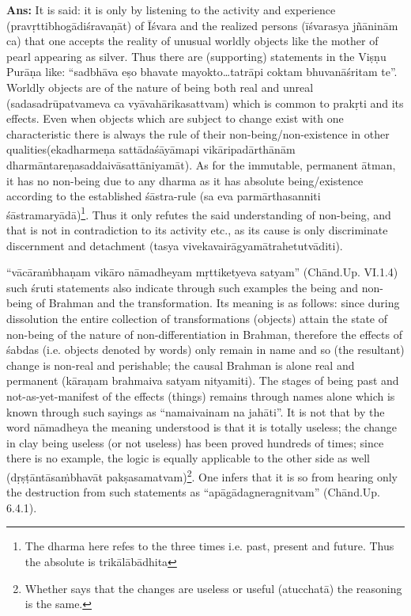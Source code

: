 \textbf{Ans:} It is said: it is only by listening to the activity and experience (pravṛttibhogādiśravaṇāt) of Īśvara and the realized persons (īśvarasya jñāninām ca) that one accepts the reality of unusual worldly objects like the mother of pearl appearing as silver. Thus there are (supporting) statements in the Viṣṇu Purāṇa like: “sadbhāva eṣo bhavate mayo\-kto…tatrāpi coktam bhuvanāśritam te”. Worldly objects are of the nature of being both real and unreal (sadasadrūpatvameva ca vyāvahāri\-kasattvam) which is common to prakṛti and its effects. Even when objects which are subject to change exist with one characteristic there is always the rule of their non-being/non-existence in other qualities\break (ekadharmeṇa sattādaśāyāmapi vikāripadārthānām dharmāntareṇa\break saddaivāsattāniyamāt). As for the immutable, permanent ātman, it has no non-being due to any dharma as it has absolute being/existence according to the established śāstra-rule (sa eva parmārthasanniti śāstramaryādā)\footnote{The dharma here refes to the three times i.e. past, present and future. Thus the absolute is trikālābādhita}. Thus it only refutes the said understanding of non-being, and that is not in contradiction to its activity etc., as its cause is only discriminate discernment and detachment (tasya vivekavairāgyamātrahetutvāditi).

“vācāraṁbhaṇam vikāro nāmadheyam mṛttiketyeva satyam” (Chānd.\break Up. VI.1.4) such śruti statements also indicate through such examples the being and non-being of Brahman and the transformation. Its meaning is as follows: since during dissolution the entire collection of transformations (objects) attain the state of non-being of the nature of non-differentiation in Brahman, therefore the effects of śabdas (i.e. objects denoted by words) only remain in name and so (the resultant) change is non-real and perishable; the causal Brahman is alone real and permanent (kāraṇam brahmaiva satyam nityamiti). The stages of being past and not-as-yet-manifest of the effects (things) remains through names alone which is known through such sayings as “namaivainam na jahāti”. It is not that by the word nāmadheya the meaning understood is that it is totally useless; the change in clay being useless (or not useless) has been proved hundreds of times; since there is no example,  the logic is equally applicable to the other side as well (dṛṣṭāntāsaṁbhavāt pakṣasamatvam)\footnote{Whether says that the changes are useless or useful (atucchatā) the reasoning is the same.}. One infers that it is so from hearing only the destruction from such statements as “apāgādagneragnitvam” (Chānd.Up. 6.4.1).  

